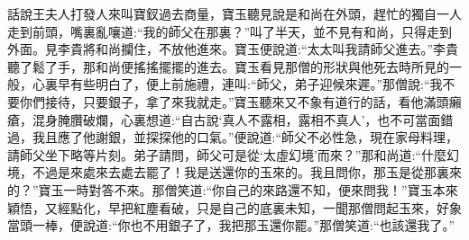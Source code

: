 


\begin{parag}
    話說王夫人打發人來叫寶釵過去商量，寶玉聽見說是和尚在外頭，趕忙的獨自一人走到前頭，嘴裏亂嚷道:“我的師父在那裏？”叫了半天，並不見有和尚，只得走到外面。見李貴將和尚攔住，不放他進來。寶玉便說道:“太太叫我請師父進去。”李貴聽了鬆了手，那和尚便搖搖擺擺的進去。寶玉看見那僧的形狀與他死去時所見的一般，心裏早有些明白了，便上前施禮，連叫:“師父，弟子迎候來遲。”那僧說:“我不要你們接待，只要銀子，拿了來我就走。”寶玉聽來又不象有道行的話，看他滿頭癩瘡，混身腌臢破爛，心裏想道:“自古說‘真人不露相，露相不真人’，也不可當面錯過，我且應了他謝銀，並探探他的口氣。”便說道:“師父不必性急，現在家母料理，請師父坐下略等片刻。弟子請問，師父可是從‘太虛幻境’而來？”那和尚道:“什麼幻境，不過是來處來去處去罷了！我是送還你的玉來的。我且問你，那玉是從那裏來的？”寶玉一時對答不來。那僧笑道:“你自己的來路還不知，便來問我！”寶玉本來穎悟，又經點化，早把紅塵看破，只是自己的底裏未知，一聞那僧問起玉來，好象當頭一棒，便說道:“你也不用銀子了，我把那玉還你罷。”那僧笑道:“也該還我了。”
\end{parag}


